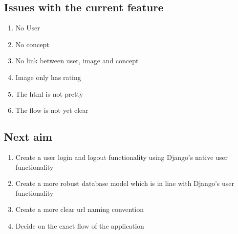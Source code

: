 \documentclass{article}
\begin{document}
\subsection{Issues with the current feature}
\begin{enumerate}
\item
No User 
\item
No concept
\item
No link between user, image and concept
\item
Image only has rating
\item
The html is not pretty
\item
The flow is not yet clear
\end{enumerate}
\subsection{Next aim}
\begin{enumerate}
\item
Create a user login and logout functionality using Django's native user functionality
\item
Create a more robust database model which is in line with Django's user functionality
\item
Create a more clear url naming convention
\item
Decide on the exact flow of the application
\end{enumerate}
\end{document}

